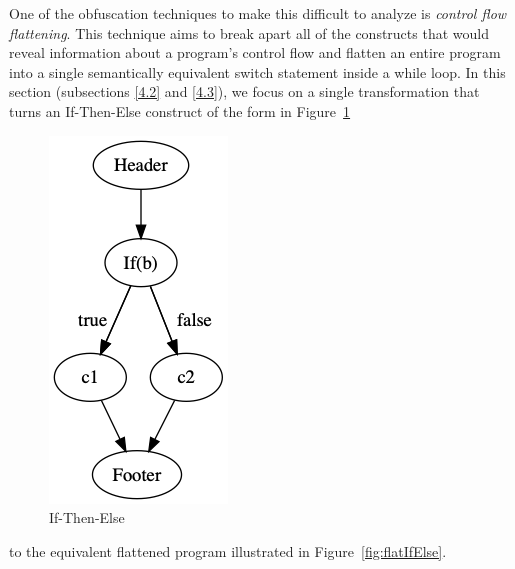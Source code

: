\documentclass[compsoc,conference,a4paper,10pt,times]{IEEEtran}
\begin{document}

One of the obfuscation techniques to make this difficult to analyze is \emph{control flow flattening}. This technique aims to break apart all of the constructs that would reveal information about a program's control flow and flatten an entire program into a single semantically equivalent switch statement inside a while loop.  
In this section (subsections \ref{4.2} and \ref{4.3}), we focus on a single transformation that turns an If-Then-Else construct of the form in Figure~\ref{fig:ifElse}
%
\begin{figure}[hbt]
\centering
\includegraphics[scale=0.27]{ifElse}
\caption{If-Then-Else}
 \label{fig:ifElse}
\end{figure}
to the equivalent flattened program illustrated in Figure~\ref{fig:flatIfElse}.
\end{document}
